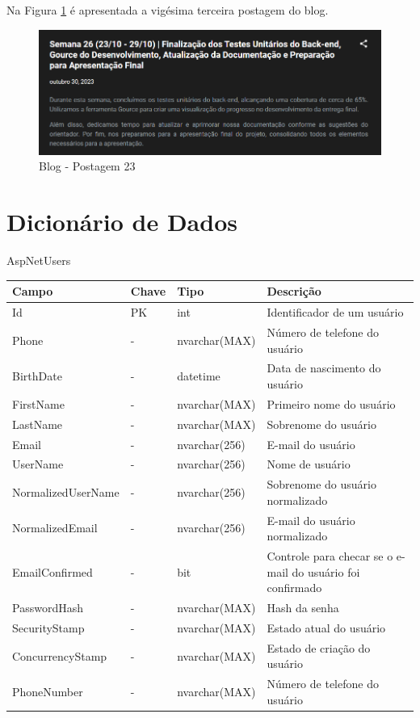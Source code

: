 \begin{apendicesenv}
Na Figura \ref{fig:131} é apresentada a vigésima terceira postagem do blog.

\begin{figure}[H]
	\centering
	\includegraphics[scale=0.68]{./imagens/Blog23.png}
	\caption{Blog - Postagem 23}
    \label{fig:131}
\end{figure}

\chapter{Dicionário de Dados}
\label{DicionarioDados}

\begin{quadro}[h!]
\centering
\caption{AspNetUsers}
\label{tab:aspnetusers}
\begin{longtable}{|p{4cm}|p{2cm}|p{3cm}|p{5cm}|}
\hline
Campo & Chave & Tipo & Descrição
\\\hline
Id & PK & int & Identificador de um usuário
\\\hline
Phone & - & nvarchar(MAX) & Número de telefone do usuário
\\\hline
BirthDate & - & datetime & Data de nascimento do usuário
\\\hline
FirstName & - & nvarchar(MAX) & Primeiro nome do usuário
\\\hline
LastName & - & nvarchar(MAX) & Sobrenome do usuário
\\\hline
Email & - & nvarchar(256) & E-mail do usuário
\\\hline
UserName & - & nvarchar(256) & Nome de usuário
\\\hline
NormalizedUserName & - & nvarchar(256) & Sobrenome do usuário normalizado
\\\hline
NormalizedEmail & - & nvarchar(256) & E-mail do usuário normalizado
\\\hline
EmailConfirmed & - & bit & Controle para checar se o e-mail do usuário foi confirmado
\\\hline
PasswordHash & - & nvarchar(MAX) & Hash da senha
\\\hline
SecurityStamp & - & nvarchar(MAX) & Estado atual do usuário
\\\hline
ConcurrencyStamp & - & nvarchar(MAX) & Estado de criação do usuário
\\\hline
PhoneNumber & - & nvarchar(MAX) & Número de telefone do usuário
\\\hline
\end{longtable}
\end{quadro}


\end{apendicesenv}
